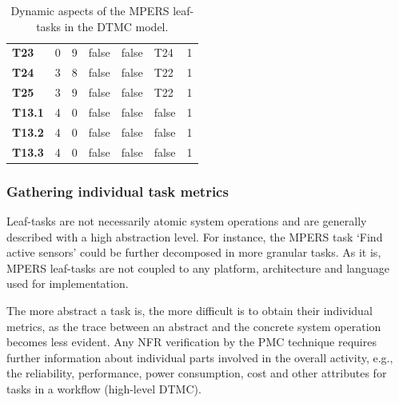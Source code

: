 \begin{table}[h]
{\begin{tabularx}{\textwidth}{@{}lllllll@{}}
\textbf{T23}   & 0                  & 9                  & false             & false                & T24                  & 1           \\
\textbf{T24}   & 3                  & 8                  & false             & false                & T22                  & 1           \\
\textbf{T25}   & 3                  & 9                  & false             & false                & T22                  & 1           \\
\textbf{T13.1} & 4                  & 0                  & false             & false                & false                & 1           \\
\textbf{T13.2} & 4                  & 0                  & false             & false                & false                & 1           \\
\textbf{T13.3} & 4                  & 0                  & false             & false                & false                & 1           \\ \bottomrule
\end{tabularx}
\caption{Dynamic aspects of the MPERS leaf-tasks in the DTMC model.}
}
\end{table}


\subsubsection{Gathering individual task metrics}

Leaf-tasks are not necessarily atomic system operations and are generally described with a high abstraction level. For instance, the MPERS task `Find active sensors' could be further decomposed in more granular tasks. As it is, MPERS leaf-tasks are not coupled to any platform, architecture and language used for implementation.


The more abstract a task is, the more difficult is to obtain their individual metrics, as the trace between an abstract and the concrete system operation becomes less evident. Any NFR verification by the PMC technique requires further information about individual parts involved in the overall activity, e.g., the reliability, performance, power consumption, cost and other attributes for tasks in a workflow (high-level DTMC).

